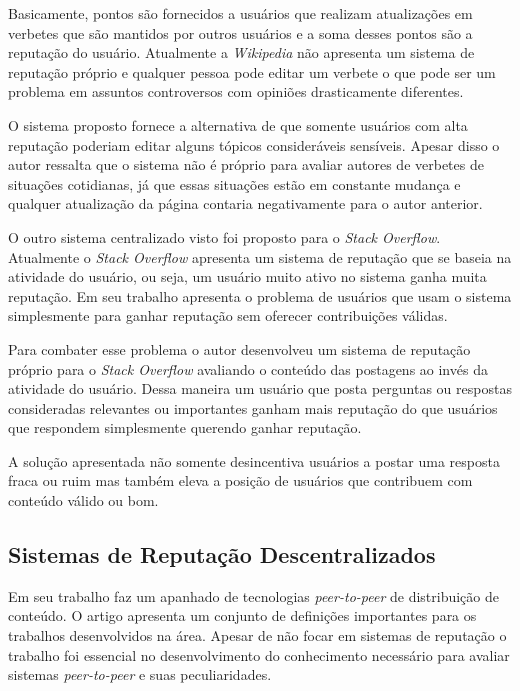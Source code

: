 \documentclass[12pt]{article}
\newcommand{\PtoP} {\emph{peer-to-peer}\xspace}
\begin{document}
Basicamente, pontos são fornecidos a usuários que realizam atualizações em verbetes que são mantidos por outros usuários e a soma desses pontos são a reputação do usuário. Atualmente a \emph{Wikipedia} não apresenta um sistema de reputação próprio e qualquer pessoa pode editar um verbete o que pode ser um problema em assuntos controversos com opiniões drasticamente diferentes.

O sistema proposto fornece a alternativa de que somente usuários com alta reputação poderiam editar alguns tópicos consideráveis sensíveis. Apesar disso o autor ressalta que o sistema não é próprio para avaliar autores de verbetes de situações cotidianas, já que essas situações estão em constante mudança e qualquer atualização da página contaria negativamente para o autor anterior.

O outro sistema centralizado visto foi proposto para o \emph{Stack Overflow}. Atualmente o \emph{Stack Overflow} apresenta um sistema de reputação que se baseia na atividade do usuário, ou seja, um usuário muito ativo no sistema ganha muita reputação. Em seu trabalho \cite{huna2016exploiting} apresenta o problema de usuários que usam o sistema simplesmente para ganhar reputação sem oferecer contribuições válidas.

Para combater esse problema o autor desenvolveu um sistema de reputação próprio para o \emph{Stack Overflow} avaliando o conteúdo das postagens ao invés da atividade do usuário. Dessa maneira um usuário que posta perguntas ou respostas consideradas relevantes ou importantes ganham mais reputação do que usuários que respondem simplesmente querendo ganhar reputação.

A solução apresentada não somente desincentiva usuários a postar uma resposta fraca ou ruim mas também eleva a posição de usuários que contribuem com conteúdo válido ou bom.

\subsection{Sistemas de Reputação Descentralizados} \label{subsec:SRDescen}

Em seu trabalho \cite{10.1145/1041680.1041681} faz um apanhado de tecnologias \PtoP de distribuição de conteúdo. O artigo apresenta um conjunto de definições importantes para os trabalhos desenvolvidos na área. Apesar de não focar em sistemas de reputação o trabalho foi essencial no desenvolvimento do conhecimento necessário para avaliar sistemas \PtoP e suas peculiaridades.
\end{document}
